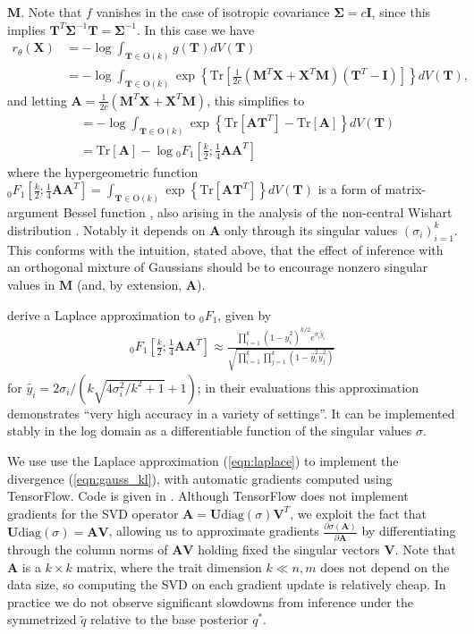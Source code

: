 \documentclass{article}
\newcommand{\Tr}{\text{Tr}}
\renewcommand{\O}{\text{O}}
\newcommand{\diag}{\text{diag}}
\renewcommand{\v}[1]{\mathbf{#1}}
\newcommand{\I}{\v{I}}
\newcommand*\pFq[2]{{}_{#1}F_{#2}}%
\begin{document}
$\v{M}$. Note that $f$ vanishes in the case of isotropic covariance $\v{\Sigma} = c\I$, since this implies
$\v{T}^T\v{\Sigma}^{-1}\v{T} = \v{\Sigma}^{-1}$. In this case we have
\begin{align*}
r_\theta(\v{X}) &= -\log \int_{\v{T}\in \O(k)}  g(\v{T}) dV(\v{T})\\
&= -\log \int_{\v{T}\in \O(k)}  \exp\left\{\Tr\left[
  \frac{1}{2c} (\v{M}^T\v{X} + \v{X}^T\v{M})
  (\v{T}^T - \I) \right] \right\} dV(\v{T}),
\end{align*}
and letting $\v{A} = \frac{1}{2c} (\v{M}^T \v{X} + \v{X}^T \v{M})$, this simplifies to
\begin{align*}
&= -\log \int_{\v{T}\in \O(k)}  \exp\left\{\Tr\left[\v{A}\v{T}^T \right] - \Tr\left[\v{A}\right]\right\} dV(\v{T})\\
&= \Tr\left[\v{A}\right] - \log \pFq{0}{1}\left[\frac{k}{2}; \frac{1}{4}\v{A}\v{A}^T\right]
\end{align*}
where the hypergeometric function $\pFq{0}{1}\left[\frac{k}{2}; \frac{1}{4}\v{A}\v{A}^T\right] = \int_{\v{T}\in \O(k)}  \exp\left\{\Tr\left[\v{A}\v{T}^T \right]\right\}
  dV(\v{T})$ is a form of matrix-argument Bessel function
  \citep{herz1955bessel}, also
  arising in the analysis of the non-central Wishart distribution
  \citep{muirhead1982aspects}. Notably it depends on $\v{A}$ only
  through its singular values $(\sigma_i)_{i=1}^k$. This conforms with
  the intuition, stated above, that the effect of inference with an orthogonal
  mixture of Gaussians should be to encourage nonzero singular values
  in $\v{M}$ (and, by extension, $\v{A}$). 

\citet{butler2003laplace} derive a Laplace approximation to $\pFq{0}{1}$,
given by
\begin{align}
\pFq{0}{1}\left[\frac{k}{2}; \frac{1}{4}\v{A}\v{A}^T\right] \approx
  \frac{\prod_{i=1}^k (1-\hat{y}_i^2)^{k/2}e^{\sigma_i\hat{y}_i}}
  {\sqrt{\prod_{i=1}^k\prod_{j=1}^k (1-\hat{y}_i^2 \hat{y}_j^2)}}\label{eqn:laplace}
\end{align}
for $\hat{y}_i = 2\sigma_i/(k \sqrt{4\sigma_i^2 / k^2 + 1} +
1)$; in their evaluations this approximation demonstrates ``very high
accuracy in a variety of settings''. It can be implemented stably in the log domain as a differentiable
function of the singular values $\sigma$. 

We use use the Laplace approximation
(\ref{eqn:laplace}) to implement the divergence
(\ref{eqn:gauss_kl}), with automatic gradients computed
using TensorFlow. 
Code is given in . Although TensorFlow does not
implement gradients for the SVD
operator $\v{A} = \v{U} \diag(\sigma) \v{V}^T$, 
we exploit the fact that $\v{U}\diag(\sigma) = \v{A}\v{V}$, allowing us to
approximate gradients $\frac{\partial
  \sigma(\v{A}) }{\partial \v{A}}$ by differentiating through the
column norms of $\v{A}\v{V}$ holding fixed the singular vectors
$\v{V}$. Note that $\v{A}$ is a $k \times k$ matrix, where the trait
dimension $k \ll n, m$ does not depend on the data size, so computing the SVD on each
gradient update is relatively cheap. In practice we do not observe
significant slowdowns from inference under the symmetrized $\tilde{q}$
relative to the base posterior $q^*$.
\end{document}
